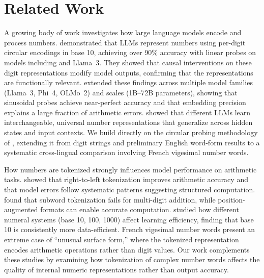 \section{Related Work}
\label{sec:related_work}

A growing body of work investigates how large language models encode and process numbers. \citet{levy2024language} demonstrated that LLMs represent numbers using per-digit circular encodings in base 10, achieving over 90\% accuracy with linear probes on models including \mistral and Llama~3. They showed that causal interventions on these digit representations modify model outputs, confirming that the representations are functionally relevant. \citet{kadlcik2025pretrained} extended these findings across multiple model families (Llama~3, Phi~4, OLMo~2) and scales (1B--72B parameters), showing that sinusoidal probes achieve near-perfect accuracy and that embedding precision explains a large fraction of arithmetic errors. \citet{stefanik2025unravelling} showed that different LLMs learn interchangeable, universal number representations that generalize across hidden states and input contexts. We build directly on the circular probing methodology of \citet{levy2024language}, extending it from digit strings and preliminary English word-form results to a systematic cross-lingual comparison involving French vigesimal number words.

How numbers are tokenized strongly influences model performance on arithmetic tasks. \citet{singh2024tokenization} showed that right-to-left tokenization improves arithmetic accuracy and that model errors follow systematic patterns suggesting structured computation. \citet{nogueira2021investigating} found that subword tokenization fails for multi-digit addition, while position-augmented formats can enable accurate computation. \citet{zhou2024scaling} studied how different numeral systems (base 10, 100, 1000) affect learning efficiency, finding that base 10 is consistently more data-efficient. French vigesimal number words present an extreme case of ``unusual surface form,'' where the tokenized representation encodes arithmetic operations rather than digit values. Our work complements these studies by examining how tokenization of complex number words affects the quality of internal numeric representations rather than output accuracy.

